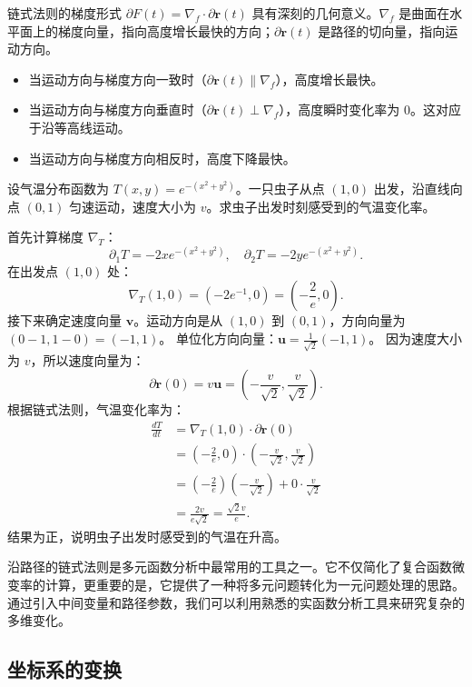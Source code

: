 \documentclass[12pt,UTF8,fontset=none]{ctexbook}
\begin{document}
链式法则的梯度形式 $\partial F(t) = \nabla_f \cdot \partial\mathbf{r}(t)$ 具有深刻的几何意义。$\nabla_f$ 是曲面在水平面上的梯度向量，指向高度增长最快的方向；$\partial\mathbf{r}(t)$ 是路径的切向量，指向运动方向。
\begin{itemize}
\item 当运动方向与梯度方向一致时（$\partial\mathbf{r}(t) \parallel \nabla_f$），高度增长最快。
\item 当运动方向与梯度方向垂直时（$\partial\mathbf{r}(t) \perp \nabla_f$），高度瞬时变化率为 0。这对应于沿等高线运动。
\item 当运动方向与梯度方向相反时，高度下降最快。
\end{itemize}

\begin{et}
设气温分布函数为 $T(x, y) = e^{-(x^2 + y^2)}$。一只虫子从点 $(1, 0)$ 出发，沿直线向点 $(0, 1)$ 匀速运动，速度大小为 $v$。求虫子出发时刻感受到的气温变化率。
\end{et}
\begin{so}
首先计算梯度 $\nabla_T$：
$$ \partial_1 T = -2x e^{-(x^2 + y^2)}, \quad \partial_2 T = -2y e^{-(x^2 + y^2)}. $$
在出发点 $(1, 0)$ 处：
$$ \nabla_T(1, 0) = (-2e^{-1}, 0) = \left(-\frac{2}{e}, 0\right). $$
接下来确定速度向量 $\mathbf{v}$。运动方向是从 $(1, 0)$ 到 $(0, 1)$，方向向量为 $(0-1, 1-0) = (-1, 1)$。
单位化方向向量：$\mathbf{u} = \frac{1}{\sqrt{2}}(-1, 1)$。
因为速度大小为 $v$，所以速度向量为：
$$ \partial \mathbf{r}(0) = v \mathbf{u} = \left(-\frac{v}{\sqrt{2}}, \frac{v}{\sqrt{2}}\right). $$
根据链式法则，气温变化率为：
\begin{align*}
\frac{dT}{dt} &= \nabla_T(1, 0) \cdot \partial \mathbf{r}(0) \\
&= \left(-\frac{2}{e}, 0\right) \cdot \left(-\frac{v}{\sqrt{2}}, \frac{v}{\sqrt{2}}\right) \\
&= \left(-\frac{2}{e}\right)\left(-\frac{v}{\sqrt{2}}\right) + 0 \cdot \frac{v}{\sqrt{2}} \\
&= \frac{2v}{e\sqrt{2}} = \frac{\sqrt{2}v}{e}.
\end{align*}
结果为正，说明虫子出发时感受到的气温在升高。
\end{so}

沿路径的链式法则是多元函数分析中最常用的工具之一。它不仅简化了复合函数微变率的计算，更重要的是，它提供了一种将多元问题转化为一元问题处理的思路。通过引入中间变量和路径参数，我们可以利用熟悉的实函数分析工具来研究复杂的多维变化。

\subsection{坐标系的变换}
\end{document}
